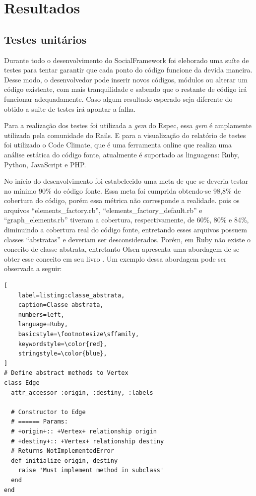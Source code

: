 \chapter{Resultados}
\label{chapter:Resultados}

\section{Testes unitários}

Durante todo o desenvolvimento do SocialFramework foi eleborado uma suíte de testes para tentar garantir que cada ponto do código funcione da devida maneira. Desse modo, o desenvolvedor pode inserir novos códigos, módulos ou alterar um código existente, com mais tranquilidade e sabendo que o restante de código irá funcionar adequadamente. Caso algum resultado esperado seja diferente do obtido a suite de testes irá apontar a falha.

Para a realização dos testes foi utilizada a \textit{gem} do Rspec, essa \textit{gem} é amplamente utilizada pela comunidade do Rails. E para a visualização do relatório de testes foi utilizado o Code Climate, que é uma ferramenta online que realiza uma análise estática do código fonte, atualmente é suportado as linguagens: Ruby, Python, JavaScript e PHP.

No início do desenvolvimento foi estabelecido uma meta de que se deveria testar no mínimo 90\% do código fonte. Essa meta foi cumprida obtendo-se 98,8\% de cobertura do código, porém essa métrica não corresponde a realidade. pois os arquivos ``elements\_factory.rb'', ``elements\_factory\_default.rb'' e ``graph\_elements.rb'' tiveram a cobertura, respectivamente, de 60\%, 80\% e 84\%, diminuindo a cobertura real do código fonte, entretando esses arquivos possuem classes ``abstratas'' e deveriam ser desconsiderados. Porém, em Ruby não existe o conceito de classe abstrata, entretanto Olsen apresenta uma abordagem de se obter esse conceito em seu livro \cite{Olsen:2007}. Um exemplo dessa abordagem pode ser observada a seguir:

 \begin{lstlisting}[
    label=listing:classe_abstrata,
    caption=Classe abstrata,
    numbers=left,
    language=Ruby,
    basicstyle=\footnotesize\sffamily,
    keywordstyle=\color{red},
    stringstyle=\color{blue},
]
# Define abstract methods to Vertex
class Edge
  attr_accessor :origin, :destiny, :labels
  
  # Constructor to Edge
  # ====== Params:
  # +origin+:: +Vertex+ relationship origin
  # +destiny+:: +Vertex+ relationship destiny
  # Returns NotImplementedError
  def initialize origin, destiny
    raise 'Must implement method in subclass'
  end
end
\end{lstlisting}

